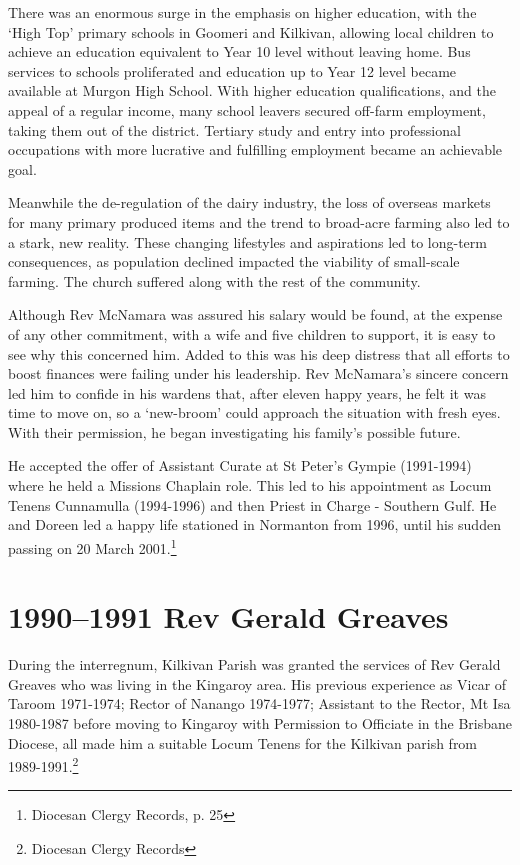 There was an enormous surge in the emphasis on higher education, with the `High Top' primary schools in Goomeri and Kilkivan, allowing local children to achieve an education equivalent to Year 10 level without leaving home. Bus services to schools proliferated and education up to Year 12 level became available at Murgon High School. With higher education qualifications, and the appeal of a regular income, many school leavers secured off-farm employment, taking them out of the district. Tertiary study and entry into professional occupations with more lucrative and fulfilling employment became an achievable goal.



Meanwhile the de-regulation of the dairy industry, the loss of overseas markets for many primary produced items and the trend to broad-acre farming also led to a stark, new reality. These changing lifestyles and aspirations led to long-term consequences, as population declined impacted the viability of small-scale farming. The church suffered along with the rest of the community.



Although Rev McNamara was assured his salary would be found, at the expense of any other commitment, with a wife and five children to support, it is easy to see why this concerned him. Added to this was his deep distress that all efforts to boost finances were failing under his leadership. Rev McNamara's sincere concern led him to confide in his wardens that, after eleven happy years, he felt it was time to move on, so a `new-broom' could approach the situation with fresh eyes. With their permission, he began investigating his family's possible future.



He accepted the offer of Assistant Curate at St Peter's Gympie (1991-1994) where he held a Missions Chaplain role. This led to his appointment as Locum Tenens Cunnamulla (1994-1996) and then Priest in Charge - Southern Gulf. He and Doreen led a happy life stationed in Normanton from 1996, until his sudden passing on 20 March 2001.\footnote{Diocesan Clergy Records, p. 25}


\section{1990--1991 Rev Gerald Greaves}



\balance


During the interregnum, Kilkivan Parish was granted the services of Rev Gerald Greaves who was living in the Kingaroy area. His previous experience as Vicar of Taroom 1971-1974; Rector of Nanango 1974-1977; Assistant to the Rector, Mt Isa 1980-1987 before moving to Kingaroy with Permission to Officiate in the Brisbane Diocese, all made him a suitable Locum Tenens for the Kilkivan parish from 1989-1991.\footnote{Diocesan Clergy Records}









